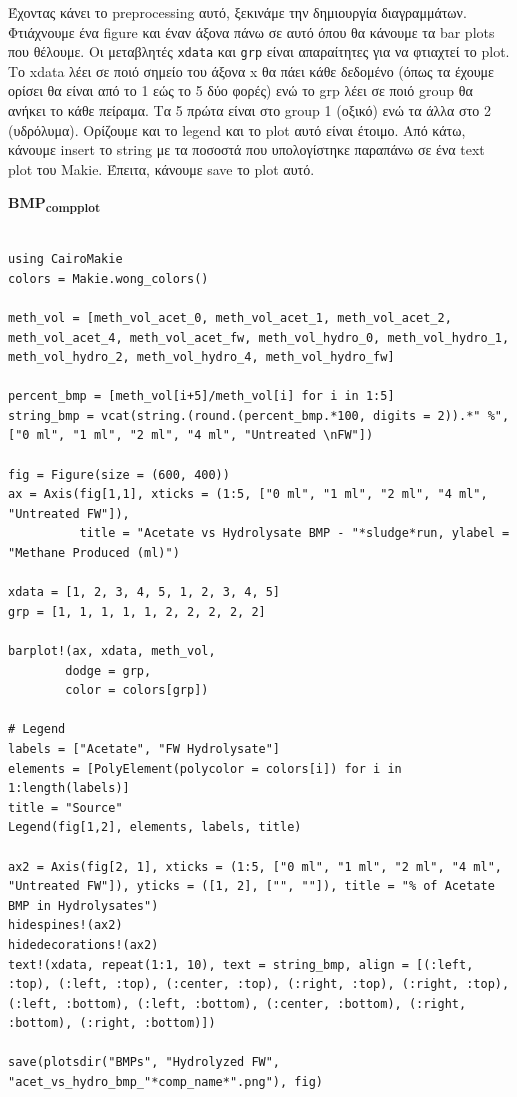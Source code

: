 \documentclass[11pt]{article}
\begin{document}
Έχοντας κάνει το preprocessing αυτό, ξεκινάμε την δημιουργία διαγραμμάτων. Φτιάχνουμε ένα figure και έναν άξονα πάνω σε αυτό όπου θα κάνουμε τα bar plots που θέλουμε. Οι μεταβλητές \texttt{xdata} και \texttt{grp} είναι απαραίτητες για να φτιαχτεί το plot. Το xdata λέει σε ποιό σημείο του άξονα x θα πάει κάθε δεδομένο (όπως τα έχουμε ορίσει θα είναι από το 1 εώς το 5 δύο φορές) ενώ το grp λέει σε ποιό group θα ανήκει το κάθε πείραμα. Τα 5 πρώτα είναι στο group 1 (οξικό) ενώ τα άλλα στο 2 (υδρόλυμα). Ορίζουμε και το legend και το plot αυτό είναι έτοιμο. Από κάτω, κάνουμε insert το string με τα ποσοστά που υπολογίστηκε παραπάνω σε ένα text plot του Makie. Έπειτα, κάνουμε save το plot αυτό.

\textbf{BMP\textsubscript{comp}\textsubscript{plot}}
\begin{verbatim}

using CairoMakie
colors = Makie.wong_colors()

meth_vol = [meth_vol_acet_0, meth_vol_acet_1, meth_vol_acet_2, meth_vol_acet_4, meth_vol_acet_fw, meth_vol_hydro_0, meth_vol_hydro_1, meth_vol_hydro_2, meth_vol_hydro_4, meth_vol_hydro_fw]

percent_bmp = [meth_vol[i+5]/meth_vol[i] for i in 1:5]
string_bmp = vcat(string.(round.(percent_bmp.*100, digits = 2)).*" %", ["0 ml", "1 ml", "2 ml", "4 ml", "Untreated \nFW"])

fig = Figure(size = (600, 400))
ax = Axis(fig[1,1], xticks = (1:5, ["0 ml", "1 ml", "2 ml", "4 ml", "Untreated FW"]),
          title = "Acetate vs Hydrolysate BMP - "*sludge*run, ylabel = "Methane Produced (ml)")

xdata = [1, 2, 3, 4, 5, 1, 2, 3, 4, 5]
grp = [1, 1, 1, 1, 1, 2, 2, 2, 2, 2]

barplot!(ax, xdata, meth_vol,
        dodge = grp,
        color = colors[grp])

# Legend
labels = ["Acetate", "FW Hydrolysate"]
elements = [PolyElement(polycolor = colors[i]) for i in 1:length(labels)]
title = "Source"
Legend(fig[1,2], elements, labels, title)

ax2 = Axis(fig[2, 1], xticks = (1:5, ["0 ml", "1 ml", "2 ml", "4 ml", "Untreated FW"]), yticks = ([1, 2], ["", ""]), title = "% of Acetate BMP in Hydrolysates")
hidespines!(ax2)
hidedecorations!(ax2)
text!(xdata, repeat(1:1, 10), text = string_bmp, align = [(:left, :top), (:left, :top), (:center, :top), (:right, :top), (:right, :top), (:left, :bottom), (:left, :bottom), (:center, :bottom), (:right, :bottom), (:right, :bottom)])

save(plotsdir("BMPs", "Hydrolyzed FW", "acet_vs_hydro_bmp_"*comp_name*".png"), fig)
\end{verbatim}
\end{document}
